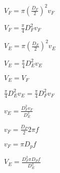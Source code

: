 \documentclass[10pt,letterpaper]{article}
\author{Charles Edward Pax}
\begin{document}
\center
$V_F = \pi\left(\frac{D_F}{2}\right)^2v_F$

$V_F = \frac{\pi}{4}D_F^2v_F$

$V_E = \pi\left(\frac{D_E}{2}\right)^2v_E$

$V_E = \frac{\pi}{4}D_E^2v_E$

$V_E = V_F$

$\frac{\pi}{4}D_E^2v_E = \frac{\pi}{4}D_F^2v_F$

$v_E = \frac{D_F^2v_F}{D_E^2}$

$v_F = \frac{D_P}{2}2\pi f$

$v_F = \pi D_pf$

$V_E = \frac{D_F^2\pi D_Pf}{D_E^2}$
\end{document}
